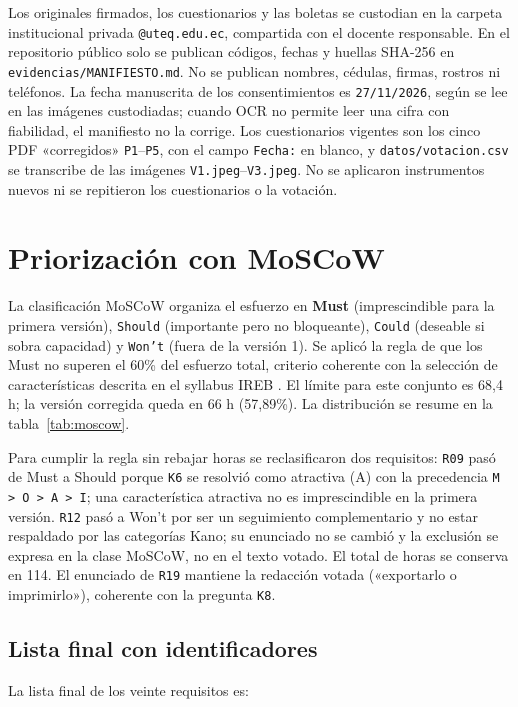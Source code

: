 \documentclass[11pt,a4paper]{article}
\begin{document}
Los originales firmados, los cuestionarios y las boletas se custodian en la carpeta institucional privada \texttt{@uteq.edu.ec}, compartida con el docente responsable. En el repositorio público solo se publican códigos, fechas y huellas SHA-256 en \texttt{evidencias/MANIFIESTO.md}. No se publican nombres, cédulas, firmas, rostros ni teléfonos. La fecha manuscrita de los consentimientos es \texttt{27/11/2026}, según se lee en las imágenes custodiadas; cuando OCR no permite leer una cifra con fiabilidad, el manifiesto no la corrige. Los cuestionarios vigentes son los cinco PDF «corregidos» \texttt{P1}--\texttt{P5}, con el campo \texttt{Fecha:} en blanco, y \texttt{datos/votacion.csv} se transcribe de las imágenes \texttt{V1.jpeg}--\texttt{V3.jpeg}. No se aplicaron instrumentos nuevos ni se repitieron los cuestionarios o la votación.

\section{Priorización con MoSCoW}
La clasificación MoSCoW organiza el esfuerzo en \textbf{Must} (imprescindible para la primera versión), \texttt{Should} (importante pero no bloqueante), \texttt{Could} (deseable si sobra capacidad) y \texttt{Won't} (fuera de la versión 1). Se aplicó la regla de que los Must no superen el 60\% del esfuerzo total, criterio coherente con la selección de características descrita en el syllabus IREB \cite{ireb2026}. El límite para este conjunto es 68,4 h; la versión corregida queda en 66 h (57,89\%). La distribución se resume en la tabla~\ref{tab:moscow}.



Para cumplir la regla sin rebajar horas se reclasificaron dos requisitos: \texttt{R09} pasó de Must a Should porque \texttt{K6} se resolvió como atractiva (A) con la precedencia \texttt{M > O > A > I}; una característica atractiva no es imprescindible en la primera versión. \texttt{R12} pasó a Won't por ser un seguimiento complementario y no estar respaldado por las categorías Kano; su enunciado no se cambió y la exclusión se expresa en la clase MoSCoW, no en el texto votado. El total de horas se conserva en 114. El enunciado de \texttt{R19} mantiene la redacción votada («exportarlo o imprimirlo»), coherente con la pregunta \texttt{K8}.

\subsection{Lista final con identificadores}
La lista final de los veinte requisitos es:
\end{document}
